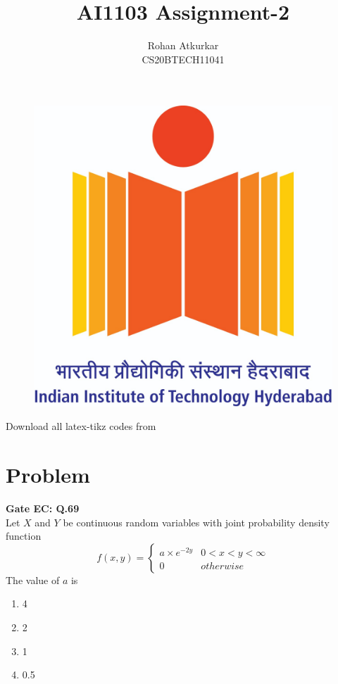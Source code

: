 \documentclass[journal,12pt,twocolumn]{IEEEtran}
\title{AI1103 Assignment-2}
\author{Rohan Atkurkar\\ CS20BTECH11041}
\date{}
\providecommand{\brak}[1]{\ensuremath{\left(#1\right)}}
\begin{document}
\maketitle
\noindent

\begin{figure} [h]
    \includegraphics[width = 0.6\columnwidth]{logo.jpeg}
\end{figure}
\vspace{0.3cm}

Download all latex-tikz codes from  

\vspace{0.3cm}  
    
   
\vspace{0.5cm}
\section*{Problem}
\textbf{ Gate EC: Q.69} \\
Let $X$ and $Y$ be continuous random variables with joint probability density function 
\begin{equation*}
    f\brak{x,y}= \begin{cases} 
      a\times e^{-2y} & 0 < x < y <\infty  \\
       0 & otherwise
   \end{cases}
\end{equation*}
The value of $a$ is
\begin{enumerate}[label=(\Alph*)]
\item 4 \label{option A}
\item 2
\item 1
\item  0.5
\end{enumerate} 
\end{document}
